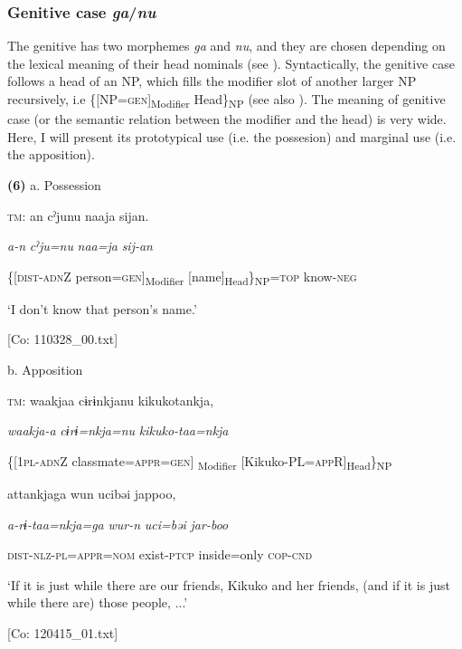 \subsubsection{ Genitive case \textit{ga}/\textit{nu}}

The genitive has two morphemes \textit{ga} and \textit{nu}, and they are chosen depending on the lexical meaning of their head nominals (see ). Syntactically, the genitive case follows a head of an NP, which fills the modifier slot of another larger NP recursively, i.e \{[NP=\textsc{gen}]\textsubscript{Modifier} Head\}\textsubscript{NP} (see also ). The meaning of genitive case (or the semantic relation between the modifier and the head) is very wide. Here, I will present its prototypical use (i.e. the possesion) and marginal use (i.e. the apposition).

\textbf{(6)}  a.  Possession

    \textsc{tm}:  an  cˀjunu  naaja  sijan.

      \textit{a-n}  \textit{cˀju=nu}  \textit{naa=ja}  \textit{sij-an}

      \{[\textsc{dist}-\textsc{adn}Z  person=\textsc{gen}]\textsubscript{Modifier}  [name]\textsubscript{Head}\}\textsubscript{NP}=\textsc{top}  know-\textsc{neg}

      ‘I don’t know that person’s name.’

      [Co: 110328\_00.txt]

  b.  Apposition

    \textsc{tm}:  waakjaa  cɨrɨnkjanu  kikukotankja,

      \textit{waakja-a}  \textit{cɨrɨ=nkja=nu}  \textit{kikuko-taa=nkja}

      \{[1\textsc{pl}-\textsc{adn}Z  classmate=\textsc{appr}=\textsc{gen}]\textsubscript{ Modifier}  [Kikuko-PL=\textsc{app}R]\textsubscript{Head}\}\textsubscript{NP}

      attankjaga  wun  ucibəi  jappoo,

      \textit{a-rɨ-taa=nkja=ga}  \textit{wur-n}  \textit{uci=bəi}  \textit{jar-boo}

      \textsc{dist}-\textsc{nlz}-\textsc{pl}=\textsc{appr}=\textsc{nom}  exist-\textsc{ptcp}  inside=only  \textsc{cop}-\textsc{cnd}

      ‘If it is just while there are our friends, Kikuko and her friends, (and if it is just while there are) those people, ...’

      [Co: 120415\_01.txt]

